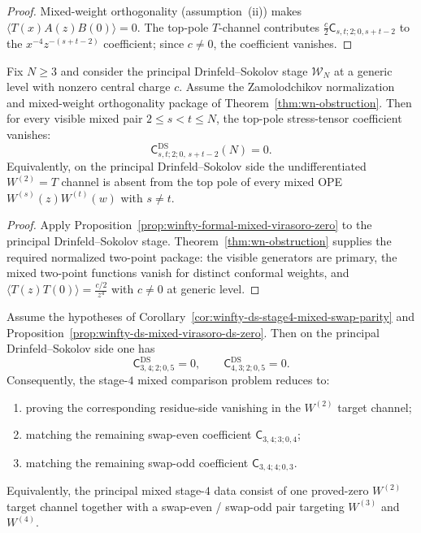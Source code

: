 \begin{proof}
Mixed-weight orthogonality (assumption~\textup{(ii)}) makes $\langle T(x)A(z)B(0)\rangle = 0$. The top-pole $T$-channel contributes $\frac{c}{2}\mathsf{C}_{s,t;2;0,s+t-2}$ to the $x^{-4}z^{-(s+t-2)}$ coefficient; since $c\neq 0$, the coefficient vanishes.
\end{proof}

\begin{proposition}
\label{prop:winfty-ds-mixed-virasoro-ds-zero}
Fix $N \ge 3$ and consider the principal Drinfeld--Sokolov stage
$\mathcal{W}_N$ at a generic level with nonzero central charge $c$.
Assume the Zamolodchikov normalization and mixed-weight orthogonality
package of Theorem~\ref{thm:wn-obstruction}. Then for every visible
mixed pair $2 \le s < t \le N$, the top-pole stress-tensor coefficient
vanishes:
\[
\mathsf{C}^{\mathrm{DS}}_{s,t;2;0,\,s+t-2}(N)=0.
\]
Equivalently, on the principal Drinfeld--Sokolov side the
undifferentiated $W^{(2)}=T$ channel is absent from the top pole of
every mixed OPE $W^{(s)}(z)W^{(t)}(w)$ with $s \ne t$.
\end{proposition}

\begin{proof}
Apply Proposition~\ref{prop:winfty-formal-mixed-virasoro-zero} to the
principal Drinfeld--Sokolov stage. Theorem~\ref{thm:wn-obstruction}
supplies the required normalized two-point package: the visible
generators are primary, the mixed two-point functions vanish for
distinct conformal weights, and
$\langle T(z)T(0)\rangle=\frac{c/2}{z^4}$ with $c\neq 0$ at generic
level.
\end{proof}

\begin{corollary}
\label{cor:winfty-ds-stage4-mixed-two-channel}
Assume the hypotheses of
Corollary~\ref{cor:winfty-ds-stage4-mixed-swap-parity} and
Proposition~\ref{prop:winfty-ds-mixed-virasoro-ds-zero}. Then on the
principal Drinfeld--Sokolov side one has
\[
\mathsf{C}^{\mathrm{DS}}_{3,4;2;0,5}=0,
\qquad
\mathsf{C}^{\mathrm{DS}}_{4,3;2;0,5}=0.
\]
Consequently, the stage-$4$ mixed comparison problem reduces to:
\begin{enumerate}[label=\textup{(\roman*)}]
\item proving the corresponding residue-side vanishing in the
 $W^{(2)}$ target channel;
\item matching the remaining swap-even coefficient
 $\mathsf{C}_{3,4;3;0,4}$;
\item matching the remaining swap-odd coefficient
 $\mathsf{C}_{3,4;4;0,3}$.
\end{enumerate}
Equivalently, the principal mixed stage-$4$ data consist of one
proved-zero $W^{(2)}$ target channel together with a
swap-even / swap-odd pair targeting $W^{(3)}$ and $W^{(4)}$.
\end{corollary}

